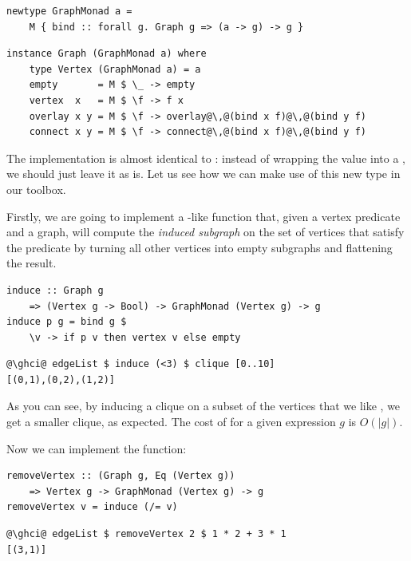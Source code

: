 \begin{verbatim}
newtype GraphMonad a =
    M { bind :: forall g. Graph g => (a -> g) -> g }
\end{verbatim}
\vspace{1mm}
\begin{verbatim}
instance Graph (GraphMonad a) where
    type Vertex (GraphMonad a) = a
    empty       = M $ \_ -> empty
    vertex  x   = M $ \f -> f x
    overlay x y = M $ \f -> overlay@\,@(bind x f)@\,@(bind y f)
    connect x y = M $ \f -> connect@\,@(bind x f)@\,@(bind y f)
\end{verbatim}

The implementation is almost identical to : instead of
wrapping the value  into a , we should just leave it as is.
Let us see how we can make use of this new type in our toolbox.

Firstly, we are going to implement a -like function 
that, given a vertex predicate and a graph, will compute the \emph{induced subgraph}
on the set of vertices that satisfy the predicate by turning all other
vertices into empty subgraphs and flattening the result.

\begin{verbatim}
induce :: Graph g
    => (Vertex g -> Bool) -> GraphMonad (Vertex g) -> g
induce p g = bind g $
    \v -> if p v then vertex v else empty
\end{verbatim}
\vspace{1mm}
\begin{verbatim}
@\ghci@ edgeList $ induce (<3) $ clique [0..10]
[(0,1),(0,2),(1,2)]
\end{verbatim}

\noindent
As you can see, by inducing a clique on a subset of the vertices
that we like , we get a smaller clique, as expected.
The cost of  for a given expression $g$ is $O(|g|)$.

Now we can implement the  function:

\begin{verbatim}
removeVertex :: (Graph g, Eq (Vertex g))
    => Vertex g -> GraphMonad (Vertex g) -> g
removeVertex v = induce (/= v)
\end{verbatim}
\vspace{1mm}
\begin{verbatim}
@\ghci@ edgeList $ removeVertex 2 $ 1 * 2 + 3 * 1
[(3,1)]
\end{verbatim}

